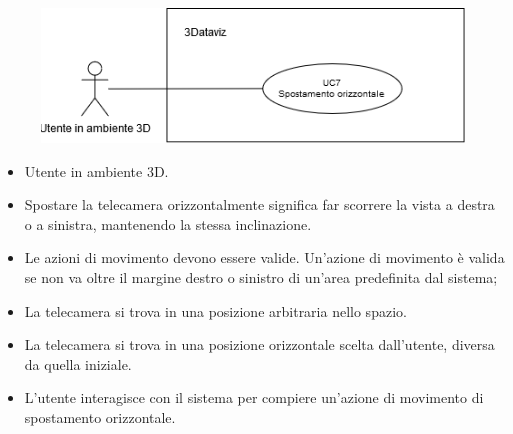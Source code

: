     \begin{figure}[h!]
        \centering
        \includegraphics[scale=0.65]{template/images/UC7.png}
        \caption{}
    \end{figure}
    \UCdsc
        { %
            \begin{itemize}
                \item Utente in ambiente 3D.
            \end{itemize}
        }
        { %
            \begin{itemize}
                \item Spostare la telecamera orizzontalmente significa far scorrere la vista a destra o a sinistra, mantenendo la stessa inclinazione.
            \end{itemize}
        }
        { %
            \begin{itemize}
                \item Le azioni di movimento devono essere valide. Un'azione di movimento è valida se non va oltre il margine destro o sinistro di un'area predefinita dal sistema;
                \item La telecamera si trova in una posizione arbitraria nello spazio.
            \end{itemize}
        }
        { %
            \begin{itemize}
                \item  La telecamera si trova in una posizione orizzontale scelta dall'utente, diversa da quella iniziale.
            \end{itemize}
        }
        { %
            \begin{itemize}
                \item L'utente interagisce con il sistema per compiere un'azione di movimento di spostamento orizzontale.
            \end{itemize}
        }

